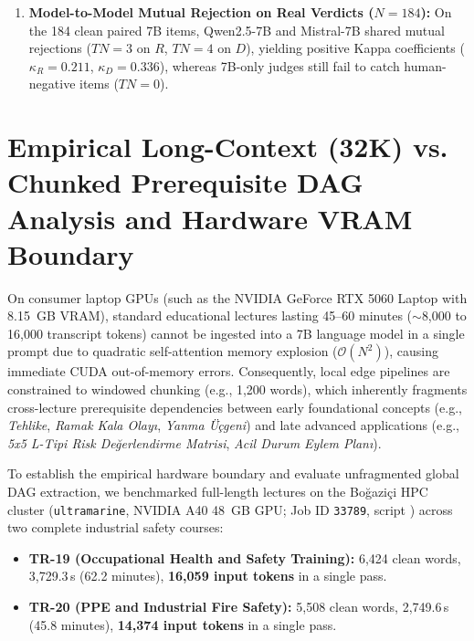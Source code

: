 \documentclass[a4paper,12pt]{report}
\begin{document}
\begin{sloppypar}
\begin{enumerate}
    \item \textbf{Model-to-Model Mutual Rejection on Real Verdicts ($N=184$):} On the 184 clean paired 7B items, Qwen2.5-7B and Mistral-7B shared mutual rejections ($TN=3$ on $R$, $TN=4$ on $D$), yielding positive Kappa coefficients ($\kappa_R = 0.211$, $\kappa_D = 0.336$), whereas 7B-only judges still fail to catch human-negative items ($TN=0$).
\end{enumerate}
\end{sloppypar}


\section{Empirical Long-Context (32K) vs. Chunked Prerequisite DAG Analysis and Hardware VRAM Boundary}
\label{sec:long_context_dag}

On consumer laptop GPUs (such as the NVIDIA GeForce RTX 5060 Laptop with 8.15~GB VRAM), standard educational lectures lasting 45--60 minutes ($\sim$8,000 to 16,000 transcript tokens) cannot be ingested into a 7B language model in a single prompt due to quadratic self-attention memory explosion ($\mathcal{O}(N^2)$), causing immediate CUDA out-of-memory errors. Consequently, local edge pipelines are constrained to windowed chunking (e.g., 1,200 words), which inherently fragments cross-lecture prerequisite dependencies between early foundational concepts (e.g., \textit{Tehlike}, \textit{Ramak Kala Olay\i}, \textit{Yanma \"U\c{c}geni}) and late advanced applications (e.g., \textit{5x5 L-Tipi Risk De\u{g}erlendirme Matrisi}, \textit{Acil Durum Eylem Plan\i}).

To establish the empirical hardware boundary and evaluate unfragmented global DAG extraction, we benchmarked full-length lectures on the Bo\u{g}azi\c{c}i HPC cluster (\texttt{ultramarine}, NVIDIA A40 48~GB GPU; Job ID \texttt{33789}, script ) across two complete industrial safety courses:
\begin{itemize}
    \item \textbf{TR-19 (Occupational Health and Safety Training):} 6,424 clean words, 3,729.3\,s (62.2 minutes), \textbf{16,059 input tokens} in a single pass.
    \item \textbf{TR-20 (PPE and Industrial Fire Safety):} 5,508 clean words, 2,749.6\,s (45.8 minutes), \textbf{14,374 input tokens} in a single pass.
\end{itemize}
\end{document}
